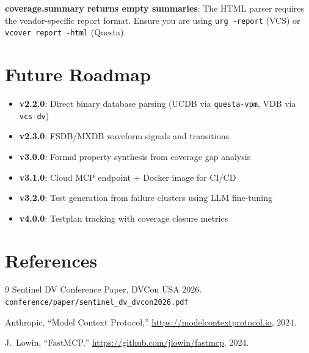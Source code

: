 \documentclass[11pt,a4paper]{article}
\begin{document}
\noindent\textbf{coverage.summary returns empty summaries}: The HTML parser
requires the vendor-specific report format. Ensure you are using
\texttt{urg -report} (VCS) or \texttt{vcover report -html} (Questa).

\section{Future Roadmap}

\begin{itemize}
  \item \textbf{v2.2.0}: Direct binary database parsing (UCDB via \texttt{questa-vpm}, VDB via \texttt{vcs-dv})
  \item \textbf{v2.3.0}: FSDB/MXDB waveform signals and transitions
  \item \textbf{v3.0.0}: Formal property synthesis from coverage gap analysis
  \item \textbf{v3.1.0}: Cloud MCP endpoint + Docker image for CI/CD
  \item \textbf{v3.2.0}: Test generation from failure clusters using LLM fine-tuning
  \item \textbf{v4.0.0}: Testplan tracking with coverage closure metrics
\end{itemize}

\section*{References}

\begin{thebibliography}{9}
Sentinel DV Conference Paper, DVCon USA 2026.
\texttt{conference/paper/sentinel\_dv\_dvcon2026.pdf}

Anthropic, ``Model Context Protocol,''
\url{https://modelcontextprotocol.io}, 2024.

J.~Lowin, ``FastMCP,'' \url{https://github.com/jlowin/fastmcp}, 2024.
\end{thebibliography}
\end{document}
